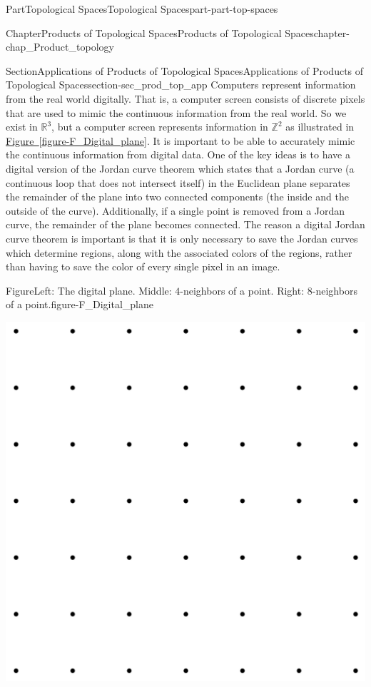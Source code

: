 \documentclass[oneside,10pt,]{book}
\newcommand{\xreffont}{\relax}
\numberwithin{equation}{chapter}
\newcommand{\Z}{\mathbb{Z}}
\newcommand{\R}{\mathbb{R}}
\begin{document}
\begin{partptx}{Part}{Topological Spaces}{}{Topological Spaces}{}{}{part-part-top-spaces}
\begin{chapterptx}{Chapter}{Products of Topological Spaces}{}{Products of Topological Spaces}{}{}{chapter-chap_Product_topology}
\begin{sectionptx}{Section}{Applications of Products of Topological Spaces}{}{Applications of Products of Topological Spaces}{}{}{section-sec_prod_top_app}
Computers represent information from the real world digitally. That is, a computer screen consists of discrete pixels that are used to mimic the continuous information from the real world. So we exist in \(\R^3\), but a computer screen represents information in \(\Z^2\) as illustrated in \hyperref[figure-F_Digital_plane]{Figure~{\xreffont\ref{figure-F_Digital_plane}}}. It is important to be able to accurately mimic the continuous information from digital data. One of the key ideas is to have a digital version of the Jordan curve theorem which states that a Jordan curve (a continuous loop that does not intersect itself) in the Euclidean plane separates the remainder of the plane into two connected components (the inside and the outside of the curve). Additionally, if a single point is removed from a Jordan curve, the remainder of the plane becomes connected. The reason a digital Jordan curve theorem is important is that it is only necessary to save the Jordan curves which determine regions, along with the associated colors of the regions, rather than having to save the color of every single pixel in an image.%
\begin{figureptx}{Figure}{Left: The digital plane. Middle: \(4\)-neighbors of a point. Right: \(8\)-neighbors of a point.}{figure-F_Digital_plane}{}%
\begin{sidebyside}{3}{0.0166666666666667}{0.0166666666666667}{0.0333333333333333}%
\begin{sbspanel}{0.3}%
\includegraphics[width=\linewidth]{external/digital_grid.pdf}

\end{sbspanel}
\end{sidebyside}
\end{figureptx}
\end{sectionptx}
\end{chapterptx}
\end{partptx}
\end{document}
